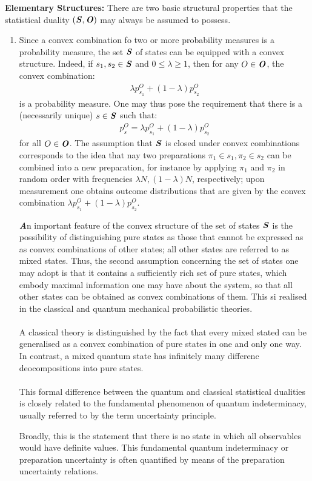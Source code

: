 \documentclass[10pt]{article}
\newcounter{theo}
\newenvironment{callout}
	{\begin{calloutbox}\color{charcoal}\textbf\textit}
	{\end{calloutbox}}
\newcommand{\state}{\textbf{\textit{S}}}
\newcommand{\observable}{\textbf{\textit{O}}}
\begin{document}
    \textbf{Elementary Structures: } There are two basic structural properties that the statistical duality $(\state, \observable)$ may always be assumed to possess. 
    \begin{enumerate}
        \item Since a convex combination fo two or more probability measures is a probability measure, the set $\state$ of states can be equipped with a convex structure. Indeed, if $s_1, s_2\in \state$ and $0\leq \lambda \geq 1$, then for any $O\in \observable$, the convex combination:
        \begin{align*}
            \lambda p_{s_1}^O + (1-\lambda)p_{s_2}^O
        \end{align*}
        is a probability measure. One may thus pose the requirement that there is a (necessarily unique) $s\in\state$ such that:
        \begin{align*}
            p_{s}^O = \lambda p_{s_1}^O +(1-\lambda)p_{s_2}^O
        \end{align*}
        for all $O \in \observable$. The assumption that $\state$ is closed under convex combinations corresponds to the idea that nay two preparations $\pi_1\in s_1, \pi_2\in s_2$ can be combined into a new preparation, for instance by applying $\pi_1$ and $\pi_2$ in random order with frequencies $\lambda N, (1-\lambda)N$, respectively; upon measurement one obtains outcome distributions that are given by the convex combination $\lambda p_{s_1}^O +(1-\lambda)p_{s_2}^O$.
        \begin{callout}
            An important feature of the convex structure of the set of states $\state$ is the possibility of distinguishing pure states as those that cannot be expressed as as convex combinations of other states;  all other states are referred to as mixed states. Thus, the second assumption concerning the set of states one may adopt is that it contains a sufficiently rich set of pure states, which embody maximal information one may have about the system, so that all other states can be obtained as convex combinations of them. This si realised in the classical and quantum mechanical probabilistic theories.
            \\
            \\
            A classical  theory is distinguished by the fact that every mixed stated can be generalised as a convex combination of pure states in one and only one way. In contrast, a mixed quantum state has infinitely many differenc deocompositions into pure states.
            \\
            \\
            This formal difference between the quantum and classical statistical dualities is closely related to the fundamental phenomenon of quantum indeterminacy, usually referred to by the term uncertainty principle.
        \end{callout}
        Broadly, this is the statement that there is no state in which all observables would have definite values. This fundamental quantum indeterminacy or preparation uncertainty is often quantified by means of the preparation uncertainty relations.
        
    \end{enumerate}
    
\end{document}
